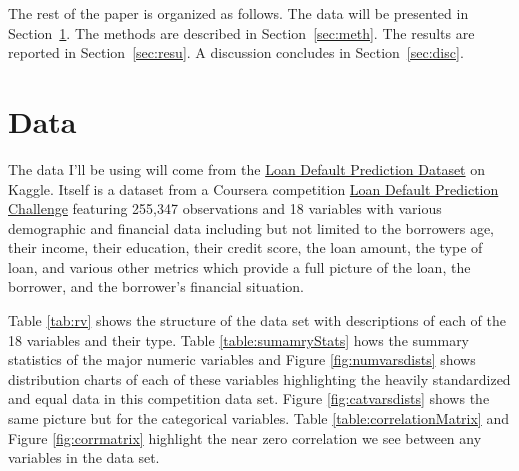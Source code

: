 \documentclass[12pt]{article}
\begin{document}
The rest of the paper is organized as follows.
The data will be presented in Section~\ref{sec:data}.
The methods are described in Section~\ref{sec:meth}.
The results are reported in Section~\ref{sec:resu}.
A discussion concludes in Section~\ref{sec:disc}.


\section{Data}
\label{sec:data}

The data I'll be using will come from the \href{https://www.kaggle.com/datasets/nikhil1e9/loan-default}{Loan Default Prediction Dataset} on Kaggle. Itself is a dataset from a Coursera competition \href{https://www.coursera.org/projects/data-science-coding-challenge-loan-default-prediction}{Loan Default Prediction Challenge} featuring 255,347 observations and 18 variables with various demographic and financial data including but not limited to the borrowers age, their income, their education, their credit score, the loan amount, the type of loan, and various other metrics which provide a full picture of the loan, the borrower, and the borrower's financial situation.

Table \ref{tab:rv} shows the structure of the data set with descriptions of each of the 18 variables and their type. Table \ref{table:sumamryStats} hows the summary statistics of the major numeric variables and Figure \ref{fig:numvarsdists} shows distribution charts of each of these variables highlighting the heavily standardized and equal data in this competition data set. Figure \ref{fig:catvarsdists} shows the same picture but for the categorical variables. Table \ref{table:correlationMatrix} and Figure \ref{fig:corrmatrix} highlight the near zero correlation we see between any variables in the data set.
\end{document}

